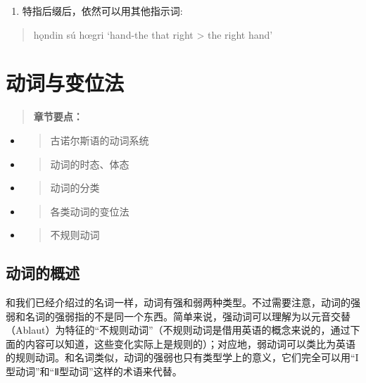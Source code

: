 \begin{enumerate}
\def\labelenumi{\arabic{enumi})}
\setcounter{enumi}{2}
\item
  特指后缀后，依然可以用其他指示词:
\end{enumerate}

\begin{quote}
hǫndin sú hœgri `hand-the that right \textgreater{} the right hand'
\end{quote}

\section{动词与变位法}\label{ux52a8ux8bcdux4e0eux53d8ux4f4dux6cd5}

\begin{quote}
\textbf{章节要点：}
\end{quote}

\begin{itemize}
\item
  \begin{quote}
  古诺尔斯语的动词系统
  \end{quote}
\item
  \begin{quote}
  动词的时态、体态
  \end{quote}
\item
  \begin{quote}
  动词的分类
  \end{quote}
\item
  \begin{quote}
  各类动词的变位法
  \end{quote}
\item
  \begin{quote}
  不规则动词
  \end{quote}
\end{itemize}

\subsection{动词的概述}\label{ux52a8ux8bcdux7684ux6982ux8ff0}

和我们已经介绍过的名词一样，动词有强和弱两种类型。不过需要注意，动词的强弱和名词的强弱指的不是同一个东西。简单来说，强动词可以理解为以元音交替（Ablaut）为特征的``不规则动词''（不规则动词是借用英语的概念来说的，通过下面的内容可以知道，这些变化实际上是规则的）；对应地，弱动词可以类比为英语的规则动词。和名词类似，动词的强弱也只有类型学上的意义，它们完全可以用``I型动词''和``Ⅱ型动词''这样的术语来代替。

